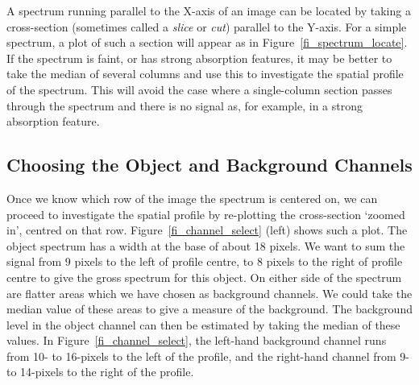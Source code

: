 \documentclass[twoside,11pt]{starlink}
\providecommand{\mlabel}[1]{\xlabel{#1}\label{#1}}
\providecommand{\scspec}[2]{#1}
\begin{document}
A spectrum running parallel to the X-axis of an image can
be located by taking a cross-section (sometimes called a \emph{slice} or \emph{cut}) parallel to the Y-axis.  For a simple spectrum, a plot of such a
section will appear as in \scspec{Figure~\ref{fi_spectrum_locate}}{the figure
above}.
If the spectrum is
faint, or has strong absorption features, it may be better to take the
median of several columns and use this to investigate the spatial profile
of the spectrum.  This will avoid the case where a single-column section
passes through the spectrum and there is no signal as, for example, in a
strong absorption feature.


\subsection{\mlabel{selecting_channels}Choosing the Object and Background
            Channels}

Once we know which row of the image the spectrum is centered on, we can
proceed to investigate the spatial profile by re-plotting the
cross-section
`zoomed in', centred on that row.
\scspec{Figure~\ref{fi_channel_select}}{The first figure below}
(left) shows such a plot.
The object spectrum has a width at the base of about 18 pixels.
We want to sum the signal from 9 pixels to the left of profile
centre, to 8 pixels to the right of profile centre to give the
gross spectrum for this object.
On either side of the spectrum are flatter areas which we have
chosen as background channels.
We could take the median value of these areas to give a measure
of the background.
The background level in the object channel can then be estimated
by taking the median of these values.
In \scspec{Figure~\ref{fi_channel_select}}{the first figure below},
the left-hand background channel runs from 10- to 16-pixels to the
left of the profile, and the right-hand channel from 9- to 14-pixels
to the right of the profile.
\end{document}
